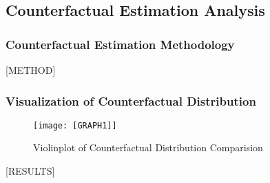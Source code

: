 \subsection{Counterfactual Estimation Analysis}

\subsubsection{Counterfactual Estimation Methodology}

[METHOD]

\subsubsection{Visualization of Counterfactual Distribution}

\begin{figure}[H]
    \centering
    \texttt{[image: [GRAPH1]]}
    \caption{Violinplot of Counterfactual Distribution Comparision}
\end{figure}

[RESULTS]
